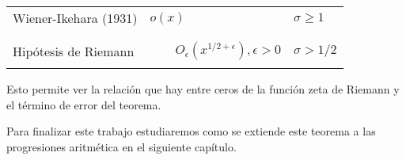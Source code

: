 \begin{note}
\begin{center}
\begin{table}[h!]
\begin{tabular}{|l|l|l|}
Wiener-Ikehara (1931) & \hspace{2.0cm}$o(x)$ & $\sigma \geq 1$ \\ 
& & \vspace*{-0.2cm}\\
\hline
& & \vspace*{-0.2cm}\\
Hipótesis de Riemann & $\displaystyle \quad\quad O_\epsilon(x^{1/2+\epsilon}), \epsilon > 0$ & $\sigma > 1/2$ \\ 
& & \vspace*{-0.2cm}\\
\hline
\end{tabular}
\end{table}
\end{center}
\vspace*{-1cm}
Esto permite ver la relación que hay entre ceros de la función zeta de Riemann y el término de error del teorema.
\end{note}
Para finalizar este trabajo estudiaremos como se extiende este teorema a las progresiones aritmética en el siguiente capítulo.